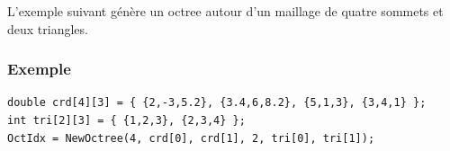 \documentclass[a4paper,12pt]{article}
\begin{document}
L'exemple suivant génère un octree autour d'un maillage de quatre sommets et deux triangles.

\subsubsection*{Exemple}

\begin{tt}
\begin{verbatim}
double crd[4][3] = { {2,-3,5.2}, {3.4,6,8.2}, {5,1,3}, {3,4,1} };
int tri[2][3] = { {1,2,3}, {2,3,4} };
OctIdx = NewOctree(4, crd[0], crd[1], 2, tri[0], tri[1]);
\end{verbatim}
\end{tt}
\normalfont
\end{document}
